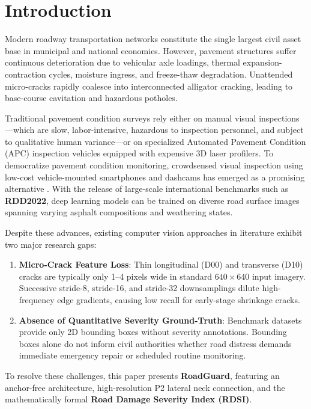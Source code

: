 \documentclass[journal,10pt]{IEEEtran}
\begin{document}
\section{Introduction}
Modern roadway transportation networks constitute the single largest civil asset base in municipal and national economies. However, pavement structures suffer continuous deterioration due to vehicular axle loadings, thermal expansion-contraction cycles, moisture ingress, and freeze-thaw degradation. Unattended micro-cracks rapidly coalesce into interconnected alligator cracking, leading to base-course cavitation and hazardous potholes.

Traditional pavement condition surveys rely either on manual visual inspections---which are slow, labor-intensive, hazardous to inspection personnel, and subject to qualitative human variance---or on specialized Automated Pavement Condition (APC) inspection vehicles equipped with expensive 3D laser profilers. To democratize pavement condition monitoring, crowdsensed visual inspection using low-cost vehicle-mounted smartphones and dashcams has emerged as a promising alternative \cite{maeda2018road, arya2021deep, arya2022crowdsensing}. With the release of large-scale international benchmarks such as \textbf{RDD2022}, deep learning models can be trained on diverse road surface images spanning varying asphalt compositions and weathering states.

Despite these advances, existing computer vision approaches in literature exhibit two major research gaps:
\begin{enumerate}
    \item \textbf{Micro-Crack Feature Loss}: Thin longitudinal (D00) and transverse (D10) cracks are typically only 1--4 pixels wide in standard $640 \times 640$ input imagery. Successive stride-8, stride-16, and stride-32 downsamplings dilute high-frequency edge gradients, causing low recall for early-stage shrinkage cracks.
    \item \textbf{Absence of Quantitative Severity Ground-Truth}: Benchmark datasets provide only 2D bounding boxes without severity annotations. Bounding boxes alone do not inform civil authorities whether road distress demands immediate emergency repair or scheduled routine monitoring.
\end{enumerate}

To resolve these challenges, this paper presents \textbf{RoadGuard}, featuring an anchor-free architecture, high-resolution P2 lateral neck connection, and the mathematically formal \textbf{Road Damage Severity Index (RDSI)}.
\end{document}
